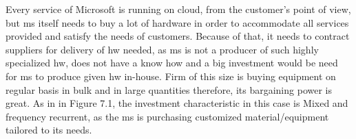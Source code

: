 Every service of Microsoft is running on cloud, from the customer’s point of view, but \acrshort{ms} itself needs to buy a lot of hardware in order to accommodate all services provided and satisfy the needs of customers. Because of that, it needs to contract suppliers for delivery of \acrshort{hw} needed, as \acrshort{ms} is not a producer of such highly specialized \acrshort{hw}, does not have a know how and a big investment would be need for \acrshort{ms} to produce given \acrshort{hw} in-house. Firm of this size is buying equipment on regular basis in bulk and in large quantities therefore, its bargaining power is great. As in \cite{Williamson1979Transaction-CostRelations} in Figure 7.1, the investment characteristic in this case is Mixed and frequency recurrent, as the \acrshort{ms} is purchasing customized material/equipment tailored to its needs.

